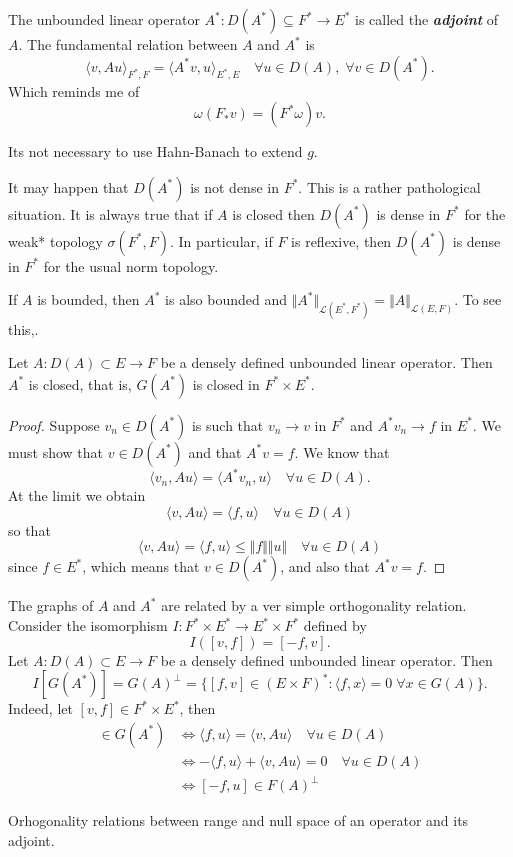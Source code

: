 \documentclass{article}
\theoremstyle{definition}
\numberwithin{equation}{section}
\begin{document}
The unbounded linear operator $A^*:D(A^*)\subseteq F^*\to E^*$ is called the \textbf{\textit{adjoint}} of $A$. The fundamental relation between $A$ and $A^*$ is
\[\langle v,Au\rangle_{F^*,F}=\langle A^*v,u\rangle_{E^*,E}\quad\forall u\in D(A),\;\forall v\in D(A^*).\]
{\color{blue}Which reminds me of
\[\omega (F_*v)=(F^*\omega)v.\]}
\begin{remark}
	Its not necessary to use Hahn-Banach to extend $g$.
\end{remark}
\begin{remark}
	It may happen that $D(A^*)$ is not dense in $F^*$. This is a rather pathological situation. It is always true that if $A$ is closed then $D(A^*)$ is dense in $F^*$ for the weak* topology $\sigma(F^*,F)$. In particular, if $F$ is reflexive, then $D(A^*)$ is dense in $F^*$ for the usual norm topology.
\end{remark}
\begin{remark}
	If $A$ is bounded, then $A^*$ is also bounded and $\Vert A^*\Vert_{\mathcal{L}(E^*,F^*)}=\Vert A\Vert_{\mathcal{L}(E,F)}$. {\color{orange} To see this,}.
\end{remark}
\begin{prop}
	Let $A:D(A)\subset E\to F$ be a densely defined unbounded linear operator. Then $A^*$ is closed, that is, $G(A^*)$ is closed in $F^*\times E^*$.
\end{prop}
\begin{proof}
	Suppose $v_n\in D(A^*)$ is such that $v_n\to v$ in $F^*$ and $A^*v_n\to f$ in $E^*$. We must show that $v\in D(A^*) $ and that $A^*v=f$. We know that
	\[\langle v_n, Au\rangle=\langle A^*v_n,u\rangle\quad\forall u\in D(A).\]
	At the limit we obtain
	\[\langle v,Au\rangle =\langle f,u\rangle\quad\forall u\in D(A)\]
	so that
	\[\langle v,Au\rangle=\langle f,u\rangle\leq \Vert f\Vert \Vert u\Vert\quad\forall u\in D(A)\]
	since $f\in E^*$, which means that $v\in D(A^*)$, and also that $A^*v=f$.
\end{proof}

The graphs of $A$ and $A^*$ are related by a ver simple orthogonality relation. Consider the isomorphism $I:F^*\times E^*\to E^*\times F^*$ defined by
\[I([v,f])=[-f,v].\]
Let $A:D(A)\subset E\to F$ be a densely defined unbounded linear operator. Then
\[I[G(A^*)]=G(A)^\perp=\{[f,v]\in (E\times F)^*:\langle f,x\rangle=0\;\forall x\in G(A)\}.\]
Indeed, let $[v,f]\in F^*\times E^*$, then
\begin{align*}
	[v,f]\in G(A^*)&\iff \langle f,u\rangle=\langle v,Au\rangle\quad\forall u\in D(A)\\
	&\iff -\langle f,u\rangle+\langle v,Au\rangle=0\quad\forall u\in D(A)\\
	&\iff [-f,u]\in F(A)^\perp
\end{align*}
\begin{coro}
	{\color{orange} Orhogonality relations between range and null space of an operator and its adjoint.}
\end{coro}
\end{document}
